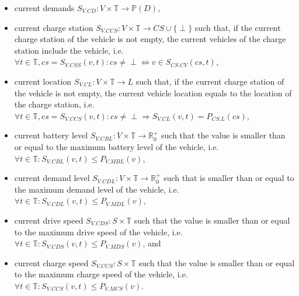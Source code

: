 \documentclass{IEEEtran}
\begin{document}
    \begin{itemize}
        \item current demands $S_{V.CD}: V \times \mathbb{T} \rightarrow \mathbb{P}(D)$,
        \item current charge station $S_{V.CCS}: V \times \mathbb{T} \rightarrow CS \cup \{\perp\}$ such that, if the current charge station of the vehicle is not empty, the current vehicles of the charge station include the vehicle, i.e.\ $\forall t \in \mathbb{T}, cs = S_{V.CSS}(v,t): cs \neq \perp \Leftrightarrow v \in S_{CS.CV}(cs,t)$,
        \item current location $S_{V.CL}: V \times \mathbb{T} \rightarrow L$ such that, if the current charge station of the vehicle is not empty, the current vehicle location equals to the location of the charge station, i.e.\ $\forall t \in \mathbb{T}, cs = S_{V.CCS}(v,t): cs \neq \perp \Rightarrow S_{V.CL}(v,t)=P_{CS.L}(cs)$,
        \item current battery level $S_{V.CBL}: V \times \mathbb{T} \rightarrow \mathbb{R}_0^+$ such that the value is smaller than or equal to the maximum battery level of the vehicle, i.e.\ $\forall t \in \mathbb{T}: S_{V.CBL}(v,t) \leq P_{V.MBL}(v)$,
        \item current demand level $S_{V.CDL}: V \times \mathbb{T} \rightarrow \mathbb{R}_0^+$ such that is smaller than or equal to the maximum demand level of the vehicle, i.e.\ $\forall t \in \mathbb{T}: S_{V.CDL}(v,t) \leq P_{V.MDL}(v)$,
        \item current drive speed $S_{V.CDS}: S \times \mathbb{T}$ such that the value is smaller than or equal to the maximum drive speed of the vehicle, i.e.\ $\forall t \in \mathbb{T}: S_{V.CDS}(v,t) \leq P_{V.MDS}(v)$, and
        \item current charge speed $S_{V.CCS}: S \times \mathbb{T}$ such that the value is smaller than or equal to the maximum charge speed of the vehicle, i.e.\ $\forall t \in \mathbb{T}: S_{V.CCS}(v,t) \leq P_{V.MCS}(v)$.
    \end{itemize}
\end{document}
